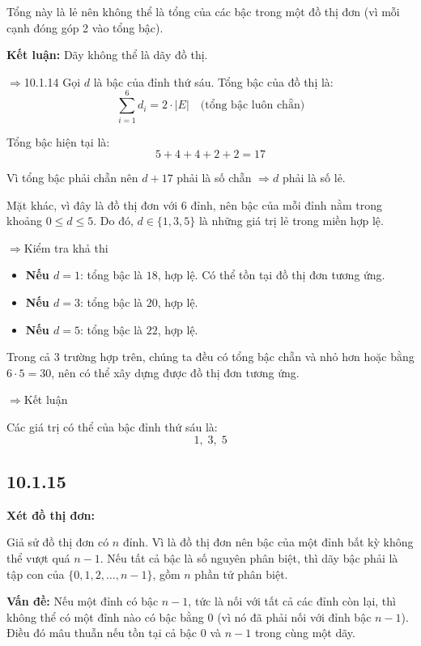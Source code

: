 \documentclass{article}
\begin{document}
	Tổng này là lẻ nên không thể là tổng của các bậc trong một đồ thị đơn (vì mỗi cạnh đóng góp 2 vào tổng bậc).
	
	\textbf{Kết luận:} Dãy không thể là dãy đồ thị.
	
		$\Rightarrow${10.1.14}
	Gọi \( d \) là bậc của đỉnh thứ sáu. Tổng bậc của đồ thị là:
	\[
	\sum_{i=1}^{6} d_i = 2 \cdot |E| \quad \text{(tổng bậc luôn chẵn)}
	\]
	
	Tổng bậc hiện tại là:
	\[
	5 + 4 + 4 + 2 + 2 = 17
	\]
	
	Vì tổng bậc phải chẵn nên \( d + 17 \) phải là số chẵn \( \Rightarrow d \) phải là số lẻ.
	
	Mặt khác, vì đây là đồ thị đơn với 6 đỉnh, nên bậc của mỗi đỉnh nằm trong khoảng \( 0 \le d \le 5 \). Do đó, \( d \in \{1, 3, 5\} \) là những giá trị lẻ trong miền hợp lệ.
	
		$\Rightarrow${Kiểm tra khả thi}
	
	\begin{itemize}
		\item \textbf{Nếu \( d = 1 \)}: tổng bậc là \( 18 \), hợp lệ. Có thể tồn tại đồ thị đơn tương ứng.
		\item \textbf{Nếu \( d = 3 \)}: tổng bậc là \( 20 \), hợp lệ.
		\item \textbf{Nếu \( d = 5 \)}: tổng bậc là \( 22 \), hợp lệ.
	\end{itemize}
	
	Trong cả 3 trường hợp trên, chúng ta đều có tổng bậc chẵn và nhỏ hơn hoặc bằng \( 6 \cdot 5 = 30 \), nên có thể xây dựng được đồ thị đơn tương ứng.
	
		$\Rightarrow${Kết luận}
	
	Các giá trị có thể của bậc đỉnh thứ sáu là:
	\[
	\boxed{1,\; 3,\; 5}
	\]
	
	\subsection*{10.1.15}
	\textbf{Xét đồ thị đơn:}
	
	Giả sử đồ thị đơn có \( n \) đỉnh. Vì là đồ thị đơn nên bậc của một đỉnh bất kỳ không thể vượt quá \( n - 1 \).  
	Nếu tất cả bậc là số nguyên phân biệt, thì dãy bậc phải là tập con của \( \{0, 1, 2, \dots, n-1\} \), gồm \( n \) phần tử phân biệt.
	
	\textbf{Vấn đề:} Nếu một đỉnh có bậc \( n-1 \), tức là nối với tất cả các đỉnh còn lại, thì không thể có một đỉnh nào có bậc bằng 0 (vì nó đã phải nối với đỉnh bậc \( n-1 \)). Điều đó mâu thuẫn nếu tồn tại cả bậc \( 0 \) và \( n-1 \) trong cùng một dãy.
	
\end{document}
